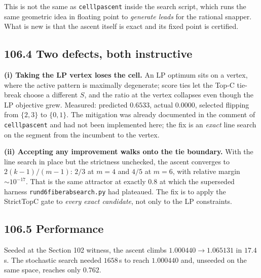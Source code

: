 \documentclass[9pt,twocolumn]{article}
\renewcommand{\_}{\CIGunderscore\allowbreak}
\begin{document}
This is not the same as \texttt{cell\_lp\_ascent} inside the search script, which runs the same geometric idea in floating point to \emph{generate leads} for the rational snapper. What is new is that the ascent itself is exact and its fixed point is certified.

\subsection*{106.4 Two defects, both instructive}
\textbf{(i) Taking the LP vertex loses the cell.} An LP optimum sits on a vertex, where the active pattern is maximally degenerate; score ties let the Top-C tie-break choose a different $S$, and the ratio at the vertex collapses even though the LP objective grew. Measured: predicted $0.6533$, actual $0.0000$, selected flipping from $\{2,3\}$ to $\{0,1\}$. The mitigation was already documented in the comment of \texttt{cell\_lp\_ascent} and had not been implemented here; the fix is an \emph{exact} line search on the segment from the incumbent to the vertex.

\textbf{(ii) Accepting any improvement walks onto the tie boundary.} With the line search in place but the strictness unchecked, the ascent converges to $2(k-1)/(m-1)$: $2/3$ at $m=4$ and $4/5$ at $m=6$, with relative margin $\sim10^{-17}$. That is the same attractor at exactly $0.8$ at which the superseded harness \texttt{run\_d6\_fiber\_ab\_search.py} had plateaued. The fix is to apply the StrictTopC gate to \emph{every exact candidate}, not only to the LP constraints.

\subsection*{106.5 Performance}
Seeded at the Section 102 witness, the ascent climbs $1.000440\to1.065131$ in $17.4$\,s. The stochastic search needed $1658$\,s to reach $1.000440$ and, unseeded on the same space, reaches only $0.762$.
\end{document}
